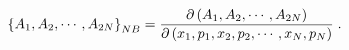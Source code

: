 \begin{equation}
\left\{  A_{1},A_{2},\cdots,A_{2N}\right\}  _{{\footnotesize NB}%
}=\frac{\partial\left(  A_{1},A_{2},\cdots,A_{2N}\right)  }{\partial\left(
x_{1},p_{1},x_{2},p_{2},\cdots,x_{N},p_{N}\right)  }\;.
\end{equation}

